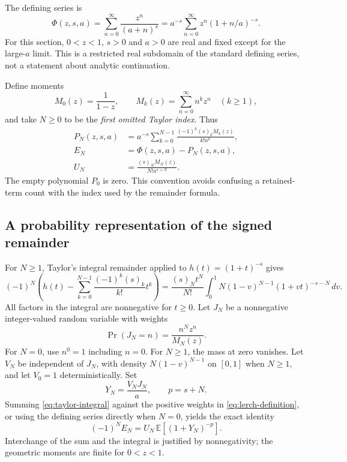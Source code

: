 \documentclass[11pt,a4paper]{article}
\newcommand{\E}{\mathbb E}
\newcommand{\PhiL}{\Phi}
\begin{document}
The defining series is
\begin{equation}\label{eq:lerch-definition}
 \PhiL(z,s,a)=\sum_{n=0}^{\infty}\frac{z^n}{(a+n)^s}
 =a^{-s}\sum_{n=0}^{\infty}z^n(1+n/a)^{-s}.
\end{equation}
For this section, $0<z<1$, $s>0$ and $a>0$ are real and fixed except for the large-$a$ limit. This is a restricted real subdomain of the standard defining series, not a statement about analytic continuation.\cite{dlmflerch}

Define moments
\begin{equation}\label{eq:moments}
 M_0(z)=\frac1{1-z},\qquad
 M_k(z)=\sum_{n=0}^{\infty}n^kz^n\quad(k\geq1),
\end{equation}
and take $N\geq0$ to be the \emph{first omitted Taylor index}. Thus
\begin{align}
 P_N(z,s,a)&=a^{-s}\sum_{k=0}^{N-1}
       \frac{(-1)^k(s)_k M_k(z)}{k!a^k},\label{eq:lerch-polynomial}\\
 E_N&=\PhiL(z,s,a)-P_N(z,s,a),\nonumber\\
 U_N&=\frac{(s)_N M_N(z)}{N!a^{s+N}}.\label{eq:lerch-U}
\end{align}
The empty polynomial $P_0$ is zero. This convention avoids confusing a retained-term count with the index used by the remainder formula.

\subsection{A probability representation of the signed remainder}
For $N\geq1$, Taylor's integral remainder applied to $h(t)=(1+t)^{-s}$ gives
\begin{equation}\label{eq:taylor-integral}
 (-1)^N\left(h(t)-\sum_{k=0}^{N-1}\frac{(-1)^k(s)_k}{k!}t^k\right)
 =\frac{(s)_N t^N}{N!}
   \int_0^1 N(1-v)^{N-1}(1+vt)^{-s-N}\,dv.
\end{equation}
All factors in the integral are nonnegative for $t\geq0$. Let $J_N$ be a nonnegative integer-valued random variable with weights
\[
 \Pr(J_N=n)=\frac{n^Nz^n}{M_N(z)}.
\]
For $N=0$, use $n^0=1$ including $n=0$. For $N\geq1$, the mass at zero vanishes. Let $V_N$ be independent of $J_N$, with density $N(1-v)^{N-1}$ on $[0,1]$ when $N\geq1$, and let $V_0=1$ deterministically. Set
\[
 Y_N=\frac{V_NJ_N}{a},\qquad p=s+N.
\]
Summing \eqref{eq:taylor-integral} against the positive weights in \eqref{eq:lerch-definition}, or using the defining series directly when $N=0$, yields the exact identity
\begin{equation}\label{eq:remainder-expectation}
 \boxed{\quad (-1)^N E_N=U_N\,\E[(1+Y_N)^{-p}].\quad}
\end{equation}
Interchange of the sum and the integral is justified by nonnegativity; the geometric moments are finite for $0<z<1$.
\end{document}
